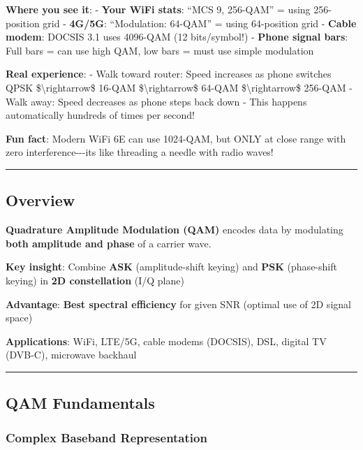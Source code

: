 \textbf{Where you see it}: - \textbf{Your WiFi stats}: ``MCS 9,
256-QAM'' = using 256-position grid - \textbf{4G/5G}: ``Modulation:
64-QAM'' = using 64-position grid - \textbf{Cable modem}: DOCSIS 3.1
uses 4096-QAM (12 bits/symbol!) - \textbf{Phone signal bars}: Full bars
= can use high QAM, low bars = must use simple modulation

\textbf{Real experience}: - Walk toward router: Speed increases as phone
switches QPSK \$\textbackslash rightarrow\$ 16-QAM
\$\textbackslash rightarrow\$ 64-QAM \$\textbackslash rightarrow\$
256-QAM - Walk away: Speed decreases as phone steps back down - This
happens automatically hundreds of times per second!

\textbf{Fun fact}: Modern WiFi 6E can use 1024-QAM, but ONLY at close
range with zero interference-\/-\/-it\textquotesingle s like threading a
needle with radio waves!

\begin{center}\rule{0.5\linewidth}{0.5pt}\end{center}

\subsection{Overview}\label{overview}

\textbf{Quadrature Amplitude Modulation (QAM)} encodes data by
modulating \textbf{both amplitude and phase} of a carrier wave.

\textbf{Key insight}: Combine \textbf{ASK} (amplitude-shift keying) and
\textbf{PSK} (phase-shift keying) in \textbf{2D constellation} (I/Q
plane)

\textbf{Advantage}: \textbf{Best spectral efficiency} for given SNR
(optimal use of 2D signal space)

\textbf{Applications}: WiFi, LTE/5G, cable modems (DOCSIS), DSL, digital
TV (DVB-C), microwave backhaul

\begin{center}\rule{0.5\linewidth}{0.5pt}\end{center}

\subsection{QAM Fundamentals}\label{qam-fundamentals}

\subsubsection{Complex Baseband
Representation}\label{complex-baseband-representation}

